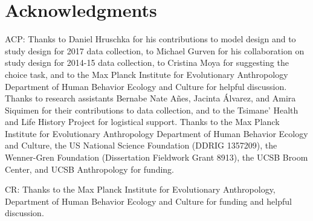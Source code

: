 \documentclass[bibauthoryear]{aa}
\begin{document}
\section*{Acknowledgments}
ACP: Thanks to Daniel Hruschka for his contributions to model design and to study design for 2017 data collection, to Michael Gurven for his collaboration on study design for 2014-15 data collection, to Cristina Moya for suggesting the choice task, and to the Max Planck Institute for Evolutionary Anthropology Department of Human Behavior Ecology and Culture for helpful discussion. Thanks to research assistants Bernabe Nate Añes, Jacinta Álvarez, and Amira Siquimen for their contributions to data collection, and to the Tsimane' Health and Life History Project for logistical support. Thanks to the Max Planck Institute for Evolutionary Anthropology Department of Human Behavior Ecology and Culture, the US National Science Foundation (DDRIG 1357209), the Wenner-Gren Foundation (Dissertation Fieldwork Grant 8913), the UCSB Broom Center, and UCSB Anthropology for funding.

CR: Thanks to the Max Planck Institute for Evolutionary Anthropology, Department of Human Behavior Ecology and Culture for funding and helpful discussion. 




\end{document}
